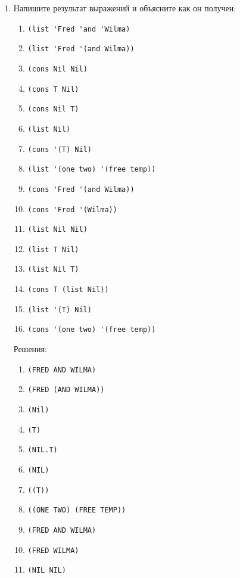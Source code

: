 \begin{enumerate}[wide=0pt]
Решения:
\begin{tasks}[label=\arabic*), item-indent=3pt, after-item-skip=1pt, column-sep=20pt](2)
	\task \lstinline{RED}
	\task \lstinline{Nil}
	\task \lstinline{(DEF)}
	\task \lstinline{(GHI)}
\end{tasks}
\item Напишите результат выражений и объясните как он получен:
\begin{enumerate}[label=\arabic*)]
	\item \lstinline{(list 'Fred 'and 'Wilma)}
	\item \lstinline{(list 'Fred '(and Wilma))}
	\item \lstinline{(cons Nil Nil)}
	\item \lstinline{(cons T Nil)}
	\item \lstinline{(cons Nil T)}
	\item \lstinline{(list Nil)}
	\item \lstinline{(cons '(T) Nil)}
	\item \lstinline{(list '(one two) '(free temp))}
	\item \lstinline{(cons 'Fred '(and Wilma))}
	\item \lstinline{(cons 'Fred '(Wilma))}
	\item \lstinline{(list Nil Nil)}
	\item \lstinline{(list T Nil)}
	\item \lstinline{(list Nil T)}
	\item \lstinline{(cons T (list Nil))}
	\item \lstinline{(list '(T) Nil)}
	\item \lstinline{(cons '(one two) '(free temp))}
\end{enumerate}
Решения:
\begin{enumerate}[label=\arabic*)]
	\item \lstinline{(FRED AND WILMA)}
	\item \lstinline{(FRED (AND WILMA))}
	\item \lstinline{(Nil)}
	\item \lstinline{(T)}
	\item \lstinline{(NIL.T)}
	\item \lstinline{(NIL)}
	\item \lstinline{((T))}
	\item \lstinline{((ONE TWO) (FREE TEMP))}
	\item \lstinline{(FRED AND WILMA)}
	\item \lstinline{(FRED WILMA)}
	\item \lstinline{(NIL NIL)}

\end{enumerate}
\end{enumerate}
